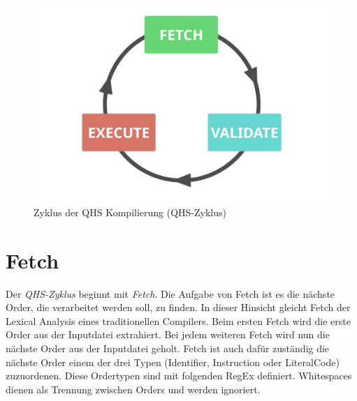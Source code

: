 \begin{figure}[h!]
    \centering
    \includegraphics[scale=0.6]{resources/images/qhs-cycle.png}
    \caption{Zyklus der QHS Kompilierung (QHS-Zyklus)}
    \label{fig:qhs-cycle}
\end{figure}

\section{Fetch} \label{sec:qhs-fetch}
Der \textit{QHS-Zyklus} beginnt mit \textit{Fetch}. 
Die Aufgabe von Fetch ist es die nächste Order, die verarbeitet werden soll, zu finden. In dieser Hinsicht gleicht Fetch der Lexical Analysis eines traditionellen Compilers.
Beim ersten Fetch wird die erste Order aus der Inputdatei extrahiert. Bei jedem weiteren Fetch wird nun die nächste Order aus der Inputdatei geholt.
Fetch ist auch dafür zuständig die nächste Order einem der drei Typen (Identifier, Instruction oder LiteralCode) zuzuordenen.
Diese Ordertypen sind mit folgenden RegEx definiert. Whitespaces dienen als Trennung zwischen Orders und werden ignoriert.

